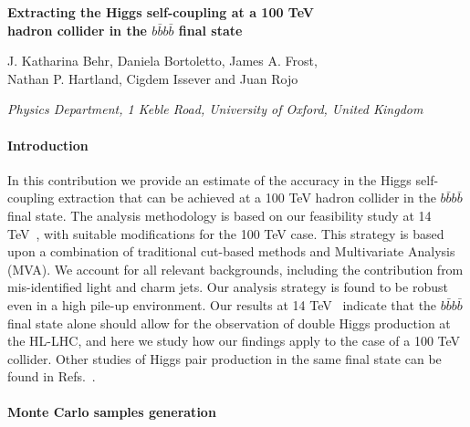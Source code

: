 \documentclass[a4paper,10pt]{article}
\begin{document}
\begin{center}
  {\Large \bf Extracting the Higgs self-coupling at a 100 TeV\\[0.2cm] hadron
  collider in the $b\bar{b}b\bar{b}$ final state}
\vspace{.7cm}

J. Katharina Behr, Daniela Bortoletto, James A. Frost,\\
  Nathan P. Hartland, Cigdem Issever and Juan Rojo


\vspace{.3cm}
{\it Physics Department, 1 Keble Road, University of Oxford, United Kingdom }

\end{center}
\vspace{0.2cm}


\paragraph{Introduction}

In this contribution we provide an estimate of the accuracy
in the Higgs self-coupling extraction that can be achieved at a 100 TeV
hadron collider in the  $b\bar{b}b\bar{b}$ final state.
%
The analysis methodology is based on our feasibility
study at 14 TeV~\cite{Behr:2015oqq}, with suitable modifications for the 100 TeV
case.
%
This strategy is based upon a combination of traditional cut-based
 methods and Multivariate Analysis (MVA).
  We account for  all relevant
  backgrounds, including the contribution from mis-identified
  light and charm jets.
  Our analysis strategy is found to be robust even in a high pile-up
  environment.
 Our results at 14 TeV~\cite{Behr:2015oqq} indicate that 
  the $b\bar{b}b\bar{b}$ 
final state
alone should allow for the observation of double Higgs production
  at the HL-LHC, and here we study how our findings apply to the case of a 100
  TeV collider.
  Other studies of Higgs pair production in the same
final state can be found in Refs.~\cite{Wardrope:2014kya,deLima:2014dta}.

\paragraph{Monte Carlo samples generation}
\end{document}
